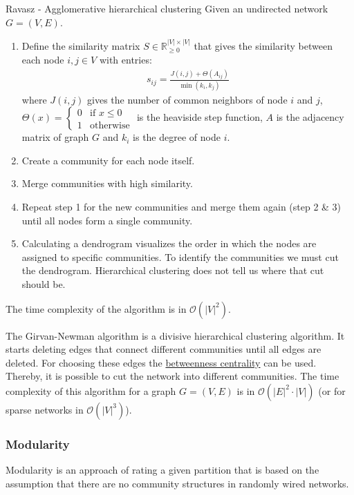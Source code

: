 \documentclass[english]{panikzettel}
\begin{document}
\begin{algo}{Ravasz - Agglomerative hierarchical clustering}
Given an undirected network $ G = (V,E) $.
\begin{enumerate}
	\item Define the similarity matrix $ S \in \mathbb{R}_{\geq 0}^{|V| \times |V|} $ that gives the similarity between each node $ i,j \in V $ with entries:
	\begin{align*}
		s_{ij} = \frac{J(i,j) + \Theta (A_{ij})}{\min(k_i, k_j)}
	\end{align*}
	where $ J(i,j) $ gives the number of common neighbors of node $ i $ and $ j $, $ \Theta(x) = \begin{cases}
	0 & \text{if } x \leq 0 \\
	1 & \text{otherwise}
	\end{cases} $ is the heaviside step function, $ A $ is the adjacency matrix of graph $ G $ and $ k_i $ is the degree of node $ i $.

	\item Create a community for each node itself.
	\item Merge communities with high similarity.
	\item Repeat step 1 for the new communities and merge them again (step 2 \& 3) until all nodes form a single community.
	\item Calculating a dendrogram visualizes the order in which the nodes are assigned to specific communities.
	To identify the communities we must cut	the dendrogram.
	Hierarchical clustering	does not tell us where that cut should be.
\end{enumerate}
\end{algo}
The time complexity of the algorithm is in $ \mathcal{O}(|V|^2) $.

The Girvan-Newman algorithm is a divisive hierarchical clustering algorithm.
It starts deleting edges that connect different communities until all edges are deleted.
For choosing these edges the \hyperref[sec:betweenness_centrality]{betweenness centrality} can be used.
Thereby, it is possible to cut the network into different communities.
The time complexity of this algorithm for a graph $ G = (V,E) $ is in $ \mathcal{O}(|E|^2 \cdot |V|) $ (or for sparse networks in $ \mathcal{O}(|V|^3) $).

\subsubsection{Modularity}
Modularity is an approach of rating a given partition that is based on the assumption that there are no community structures in randomly wired networks.
\end{document}

